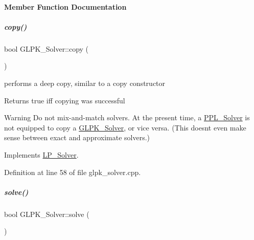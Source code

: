 \paragraph{Member Function Documentation}
\mbox{\label{group___c_l_s_solvers_aff3a58ef3def363dfad9e0ba8eee3e67}} 
\subparagraph{\texorpdfstring{copy()}{copy()}}
{\footnotesize\ttfamily bool G\+L\+P\+K\+\_\+\+Solver\+::copy (\begin{DoxyParamCaption}\item[{const \hyperlink{group___c_l_s_solvers_class_l_p___solver}{L\+P\+\_\+\+Solver} $\ast$}]{ }\end{DoxyParamCaption})\hspace{0.3cm}{\ttfamily [virtual]}}



performs a deep copy, similar to a copy constructor 

\begin{DoxyReturn}{Returns}
{\ttfamily true} iff copying was successful 
\end{DoxyReturn}
\begin{DoxyWarning}{Warning}
Do not mix-\/and-\/match solvers. At the present time, a \hyperlink{group___c_l_s_solvers_class_p_p_l___solver}{P\+P\+L\+\_\+\+Solver} is not equipped to copy a \hyperlink{group___c_l_s_solvers_class_g_l_p_k___solver}{G\+L\+P\+K\+\_\+\+Solver}, or vice versa. (This doesn\textquotesingle{}t even make sense between exact and approximate solvers.) 
\end{DoxyWarning}


Implements \hyperlink{group___c_l_s_solvers_a442ad4ad67ee2feff0df49e9201d61ca}{L\+P\+\_\+\+Solver}.



Definition at line 58 of file glpk\+\_\+solver.\+cpp.

\mbox{\label{group___c_l_s_solvers_acb3a10f3961c65b4cf23ff61f0e2310b}} 
\subparagraph{\texorpdfstring{solve()}{solve()}\hspace{0.1cm}{\footnotesize\ttfamily [1/2]}}
{\footnotesize\ttfamily bool G\+L\+P\+K\+\_\+\+Solver\+::solve (\begin{DoxyParamCaption}\item[{\hyperlink{group___c_l_s_solvers_classconstraint}{constraint} \&}]{ }\end{DoxyParamCaption})\hspace{0.3cm}{\ttfamily [virtual]}}



